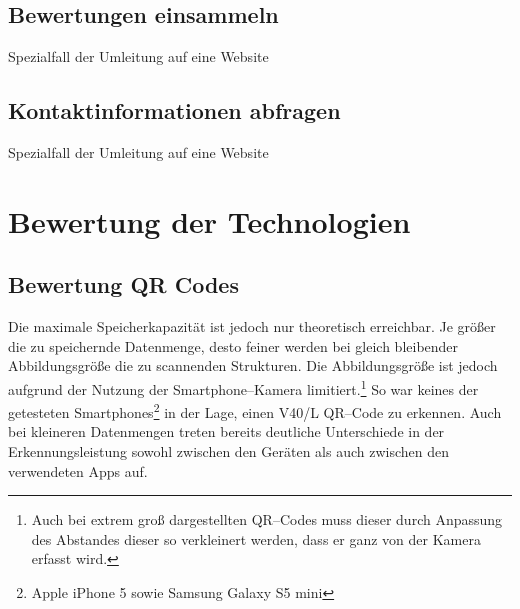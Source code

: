 \subsection{Bewertungen einsammeln} %
\label{sub:bewertungen_einsammeln}
Spezialfall der Umleitung auf eine Website


\subsection{Kontaktinformationen abfragen} %
\label{sub:kontaktinformationen_abfragen}
Spezialfall der Umleitung auf eine Website


\newpage
\section{Bewertung der Technologien} %
\label{sec:bewertung}

\subsection{Bewertung QR Codes} %
\label{sub:bewertung_qr_codes}
Die maximale Speicherkapazität ist jedoch nur theoretisch erreichbar. Je größer die zu speichernde Datenmenge, desto feiner werden bei gleich bleibender Abbildungsgröße die zu scannenden Strukturen. Die Abbildungsgröße ist jedoch aufgrund der Nutzung der Smartphone–Kamera limitiert.\footnote{Auch bei extrem groß dargestellten QR–Codes muss dieser durch Anpassung des Abstandes dieser so verkleinert werden, dass er ganz von der Kamera erfasst wird.} So war keines der getesteten Smartphones\footnote{Apple iPhone 5 sowie Samsung Galaxy S5 mini} in der Lage, einen V40/L QR–Code zu erkennen. Auch bei kleineren Datenmengen treten bereits deutliche Unterschiede in der Erkennungsleistung sowohl zwischen den Geräten als auch zwischen den verwendeten Apps auf.



